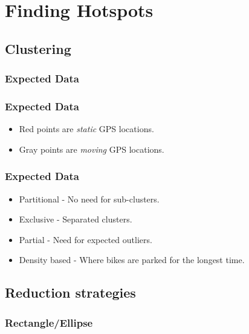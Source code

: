 \section{Finding Hotspots}

\subsection{Clustering}
\subsubsection{Expected Data}
\begin{frame}
\frametitle{Expected Data}
	\begin{itemize}
		\item {\color{red}Red} points are \textit{static} GPS locations.
		\item {\color{gray}Gray} points are \textit{moving} GPS locations.
	\end{itemize}
	
\end{frame}	
\begin{frame}
\frametitle{Expected Data}
	\begin{itemize}
		\item Partitional - No need for sub-clusters. %
		\item Exclusive - Separated clusters.
		\item Partial - Need for expected outliers.
		\item Density based - Where bikes are parked for the longest time.
	\end{itemize}
	
\end{frame}	

\subsection{Reduction strategies}
\subsubsection{Rectangle/Ellipse}
